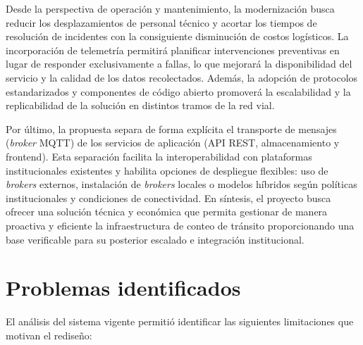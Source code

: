 Desde la perspectiva de operación y mantenimiento, la modernización busca reducir los desplazamientos de personal técnico y acortar los tiempos de resolución de incidentes con la consiguiente disminución de costos logísticos. La incorporación de telemetría permitirá planificar intervenciones preventivas en lugar de responder exclusivamente a fallas, lo que mejorará la disponibilidad del servicio y la calidad de los datos recolectados. Además, la adopción de protocolos estandarizados y componentes de código abierto promoverá la escalabilidad y la replicabilidad de la solución en distintos tramos de la red vial.

Por último, la propuesta separa de forma explícita el transporte de mensajes (\textit{broker} MQTT) de los servicios de aplicación (API REST, almacenamiento y frontend). Esta separación facilita la interoperabilidad con plataformas institucionales existentes y habilita opciones de despliegue flexibles: uso de \textit{brokers} externos, instalación de \textit{brokers} locales o modelos híbridos según políticas institucionales y condiciones de conectividad. En síntesis, el proyecto busca ofrecer una solución técnica y económica que permita gestionar de manera proactiva y eficiente la infraestructura de conteo de tránsito proporcionando una base verificable para su posterior escalado e integración institucional.


\newpage

\section{Problemas identificados}

El análisis del sistema vigente permitió identificar las siguientes limitaciones que motivan el rediseño:

